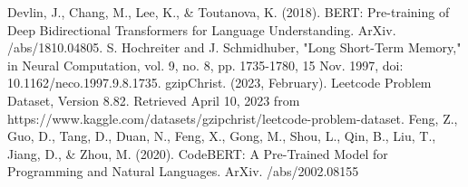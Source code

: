 \documentclass{article}
\begin{document}
{
\small

\begin{thebibliography}{9}
Devlin, J., Chang, M., Lee, K., \& Toutanova, K. (2018). BERT: Pre-training of Deep Bidirectional Transformers for Language Understanding. ArXiv. /abs/1810.04805.
S. Hochreiter and J. Schmidhuber, "Long Short-Term Memory," in Neural Computation, vol. 9, no. 8, pp. 1735-1780, 15 Nov. 1997, doi: 10.1162/neco.1997.9.8.1735.
gzipChrist. (2023, February). Leetcode Problem Dataset, Version 8.82. Retrieved April 10, 2023 from https://www.kaggle.com/datasets/gzipchrist/leetcode-problem-dataset.
Feng, Z., Guo, D., Tang, D., Duan, N., Feng, X., Gong, M., Shou, L., Qin, B., Liu, T., Jiang, D., \& Zhou, M. (2020). CodeBERT: A Pre-Trained Model for Programming and Natural Languages. ArXiv. /abs/2002.08155
\end{thebibliography}
}
%
\end{document}
